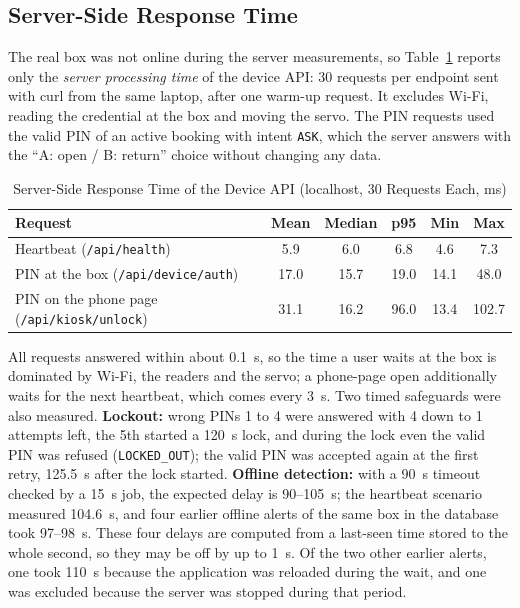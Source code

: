 \documentclass[conference, onecolumn]{IEEEtran}
\begin{document}
\subsection{Server-Side Response Time}
\label{sec:latency}

The real box was not online during the server measurements, so Table~\ref{tab:latency} reports only the \emph{server
processing time} of the device API: 30 requests per endpoint sent with curl from the same laptop, after one warm-up
request. It excludes Wi-Fi, reading the credential at the box and moving the servo. The PIN requests used the valid PIN
of an active booking with intent \texttt{ASK}, which the server answers with the ``A: open / B: return'' choice
without changing any data.

\begin{table}[H]
\renewcommand{\arraystretch}{1.3}
\centering
\caption{Server-Side Response Time of the Device API (localhost, 30 Requests Each, ms)}
\label{tab:latency}
\begin{tabular}{l c c c c c}
\hline
\textbf{Request} & \textbf{Mean} & \textbf{Median} & \textbf{p95} & \textbf{Min} & \textbf{Max} \\
\hline
Heartbeat (\texttt{/api/health})                 & 5.9  & 6.0  & 6.8  & 4.6  & 7.3 \\
PIN at the box (\texttt{/api/device/auth})       & 17.0 & 15.7 & 19.0 & 14.1 & 48.0 \\
PIN on the phone page (\texttt{/api/kiosk/unlock}) & 31.1 & 16.2 & 96.0 & 13.4 & 102.7 \\
\hline
\end{tabular}
\end{table}

All requests answered within about 0.1~s, so the time a user waits at the box is dominated by Wi-Fi, the readers and
the servo; a phone-page open additionally waits for the next heartbeat, which comes every 3~s. Two timed safeguards were
also measured. \textbf{Lockout:} wrong PINs 1 to 4 were answered with 4 down to 1 attempts left, the 5th started a
120~s lock, and during the lock even the valid PIN was refused (\texttt{LOCKED\_OUT}); the valid PIN was accepted again
at the first retry, 125.5~s after the lock started. \textbf{Offline detection:} with a 90~s timeout checked by a 15~s
job, the expected delay is 90--105~s; the heartbeat scenario measured 104.6~s, and four earlier offline alerts of the
same box in the database took 97--98~s. These four delays are computed from a last-seen time stored to the whole
second, so they may be off by up to 1~s. Of the two other earlier alerts, one took 110~s because the
application was reloaded during the wait, and one was excluded because the server was stopped during that period.
\end{document}
